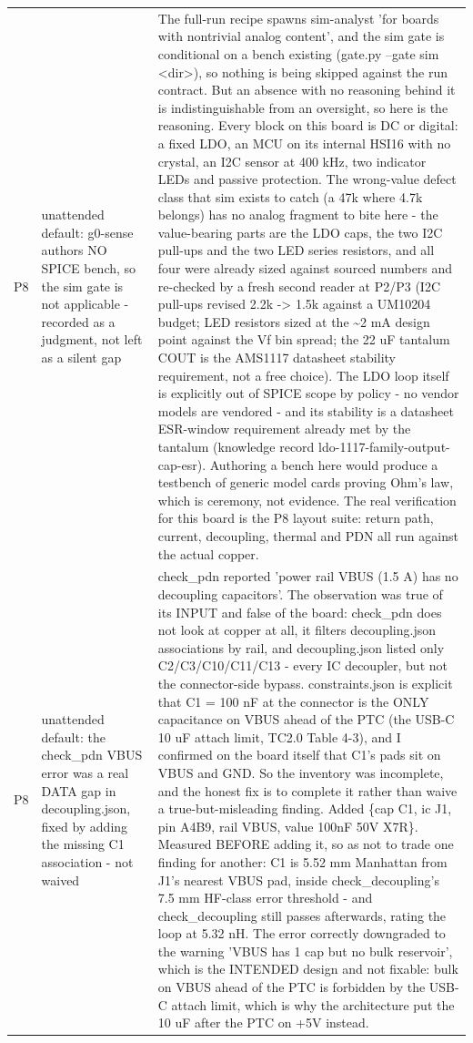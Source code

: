 \documentclass[11pt,a4paper]{article}
\begin{document}
{\begin{longtable}{lp{5.2cm}p{7.2cm}}
P8 & unattended default: g0-sense authors NO SPICE bench, so the sim gate is not applicable - recorded as a judgment, not left as a silent gap & The full-run recipe spawns sim-analyst 'for boards with nontrivial analog content', and the sim gate is conditional on a bench existing (gate.py --gate sim \textless{}dir\textgreater{}), so nothing is being skipped against the run contract. But an absence with no reasoning behind it is indistinguishable from an oversight, so here is the reasoning. Every block on this board is DC or digital: a fixed LDO, an MCU on its internal HSI16 with no crystal, an I2C sensor at 400 kHz, two indicator LEDs and passive protection. The wrong-value defect class that sim exists to catch (a 47k where 4.7k belongs) has no analog fragment to bite here - the value-bearing parts are the LDO caps, the two I2C pull-ups and the two LED series resistors, and all four were already sized against sourced numbers and re-checked by a fresh second reader at P2/P3 (I2C pull-ups revised 2.2k -\textgreater{} 1.5k against a UM10204 budget; LED resistors sized at the \textasciitilde{}2 mA design point against the Vf bin spread; the 22 uF tantalum COUT is the AMS1117 datasheet stability requirement, not a free choice). The LDO loop itself is explicitly out of SPICE scope by policy - no vendor models are vendored - and its stability is a datasheet ESR-window requirement already met by the tantalum (knowledge record ldo-1117-family-output-cap-esr). Authoring a bench here would produce a testbench of generic model cards proving Ohm's law, which is ceremony, not evidence. The real verification for this board is the P8 layout suite: return path, current, decoupling, thermal and PDN all run against the actual copper. \\
P8 & unattended default: the check\_pdn VBUS error was a real DATA gap in decoupling.json, fixed by adding the missing C1 association - not waived & check\_pdn reported 'power rail VBUS (1.5 A) has no decoupling capacitors'. The observation was true of its INPUT and false of the board: check\_pdn does not look at copper at all, it filters decoupling.json associations by rail, and decoupling.json listed only C2/C3/C10/C11/C13 - every IC decoupler, but not the connector-side bypass. constraints.json is explicit that C1 = 100 nF at the connector is the ONLY capacitance on VBUS ahead of the PTC (the USB-C 10 uF attach limit, TC2.0 Table 4-3), and I confirmed on the board itself that C1's pads sit on VBUS and GND. So the inventory was incomplete, and the honest fix is to complete it rather than waive a true-but-misleading finding. Added \{cap C1, ic J1, pin A4B9, rail VBUS, value 100nF 50V X7R\}. Measured BEFORE adding it, so as not to trade one finding for another: C1 is 5.52 mm Manhattan from J1's nearest VBUS pad, inside check\_decoupling's 7.5 mm HF-class error threshold - and check\_decoupling still passes afterwards, rating the loop at 5.32 nH. The error correctly downgraded to the warning 'VBUS has 1 cap but no bulk reservoir', which is the INTENDED design and not fixable: bulk on VBUS ahead of the PTC is forbidden by the USB-C attach limit, which is why the architecture put the 10 uF after the PTC on +5V instead. \\

\end{longtable}}
\end{document}
